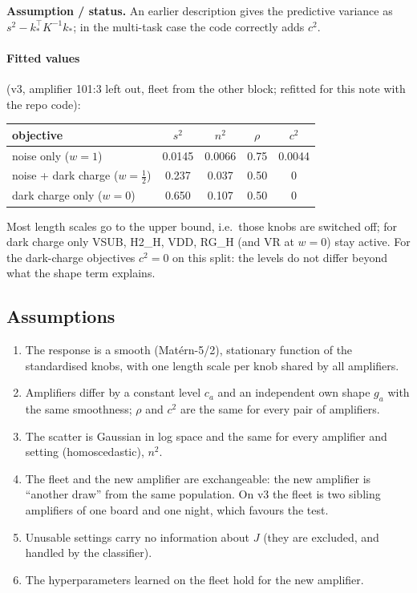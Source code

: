 \documentclass[10pt,a4paper]{article}
\newcommand{\caveat}[1]{\par\smallskip\noindent\colorbox{orange!10}{\parbox{\dimexpr\linewidth-2\fboxsep}{\small\textbf{Assumption / status.} #1}}\par\smallskip}
\begin{document}
\caveat{An earlier description gives the predictive variance as $s^2-k_*^\top K^{-1}k_*$; in the multi-task case the code
correctly adds $c^2$.}

\paragraph{Fitted values} (v3, amplifier 101:3 left out, fleet from the other block; refitted for this note with the repo
code):
\begin{center}\small
\begin{tabular}{lcccc}\toprule
objective & $s^2$ & $n^2$ & $\rho$ & $c^2$\\\midrule
noise only ($w=1$) & 0.0145 & 0.0066 & 0.75 & 0.0044\\
noise + dark charge ($w=\frac12$) & 0.237 & 0.037 & 0.50 & 0\\
dark charge only ($w=0$) & 0.650 & 0.107 & 0.50 & 0\\\bottomrule
\end{tabular}
\end{center}
Most length scales go to the upper bound, i.e.\ those knobs are switched off; for dark charge only VSUB, H2\_H, VDD, RG\_H
(and VR at $w=0$) stay active. For the dark-charge objectives $c^2=0$ on this split: the levels do not differ beyond
what the shape term explains.

\subsection{Assumptions}
\begin{enumerate}
\item The response is a smooth (Matérn-5/2), stationary function of the standardised knobs, with one length scale per knob
  shared by all amplifiers.
\item Amplifiers differ by a constant level $c_a$ and an independent own shape $g_a$ with the same smoothness; $\rho$ and $c^2$
  are the same for every pair of amplifiers.
\item The scatter is Gaussian in log space and the same for every amplifier and setting (homoscedastic), $n^2$.
\item The fleet and the new amplifier are exchangeable: the new amplifier is ``another draw'' from the same population.
  On v3 the fleet is two sibling amplifiers of one board and one night, which favours the test.
\item Unusable settings carry no information about $J$ (they are excluded, and handled by the classifier).
\item The hyperparameters learned on the fleet hold for the new amplifier.
\end{enumerate}
\end{document}
